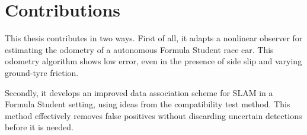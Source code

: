 \section{Contributions}
This thesis contributes in two ways. First of all, it adapts a nonlinear observer for estimating the odometry of a autonomous Formula Student race car. This odometry algorithm shows low error, even in the presence of side slip and varying ground-tyre friction. 

Secondly, it develops an improved data association scheme for \gls{SLAM} in a Formula Student setting, using ideas from the compatibility test method. This method effectively removes false positives without discarding uncertain detections before it is needed.